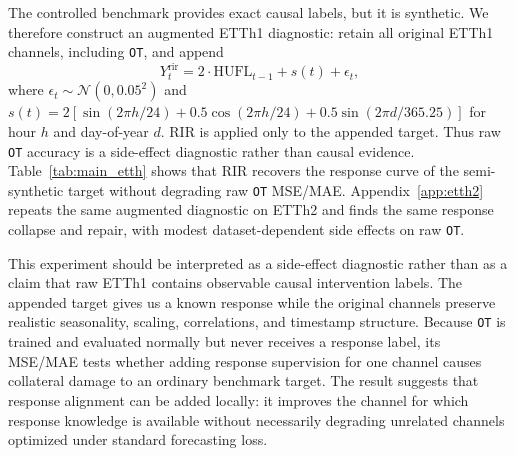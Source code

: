 \documentclass{article}
\begin{document}
The controlled benchmark provides exact causal labels, but it is synthetic. We
therefore construct an augmented ETTh1 diagnostic: retain all original ETTh1
channels, including \texttt{OT}, and append
\begin{equation}
Y^{\mathrm{rir}}_t
=2\cdot\mathrm{HUFL}_{t-1}+s(t)+\epsilon_t ,
\end{equation}
where $\epsilon_t\sim\mathcal{N}(0,0.05^2)$ and
$s(t)=2[\sin(2\pi h/24)+0.5\cos(2\pi h/24)+0.5\sin(2\pi d/365.25)]$ for hour
$h$ and day-of-year $d$. RIR is applied only to the appended target. Thus raw
\texttt{OT} accuracy is a side-effect diagnostic rather than causal evidence.
Table~\ref{tab:main_etth} shows that RIR recovers the response curve of the
semi-synthetic target without degrading raw \texttt{OT} MSE/MAE.
Appendix~\ref{app:etth2} repeats the same augmented diagnostic on ETTh2 and finds
the same response collapse and repair, with modest dataset-dependent side effects
on raw \texttt{OT}.

This experiment should be interpreted as a side-effect diagnostic rather than as a
claim that raw ETTh1 contains observable causal intervention labels. The appended
target gives us a known response while the original channels preserve realistic
seasonality, scaling, correlations, and timestamp structure. Because \texttt{OT} is
trained and evaluated normally but never receives a response label, its MSE/MAE
tests whether adding response supervision for one channel causes collateral damage
to an ordinary benchmark target. The result suggests that response alignment can be
added locally: it improves the channel for which response knowledge is available
without necessarily degrading unrelated channels optimized under standard
forecasting loss.

\begin{table}[t]
\centering
\caption{Augmented ETTh1 side-effect diagnostic at prediction length 96, reported
as mean $\pm$ standard deviation over three seeds.}
\label{tab:main_etth}
\end{table}
\end{document}
